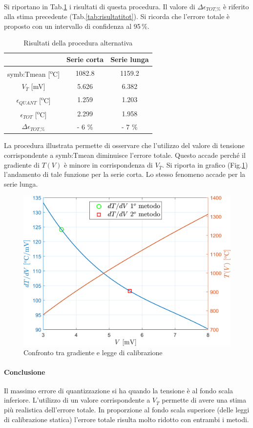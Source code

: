 Si riportano in Tab.\ref{tab:alternativa} i risultati di questa procedura. Il valore di $\Delta \epsilon_{\textit{TOT,\%}}$ è riferito alla stima precedente (Tab.\ref{tab:risultatitot}). Si ricorda che l'errore totale è proposto con un intervallo di confidenza al 95\,\%.

\begin{table}[H]
	\centering
	\begin{tabular}{c|c|c}
		\toprule
		\toprule
		& \textbf{Serie corta} & \textbf{Serie lunga}\\
		\midrule
		\gls{symb:Tmean} [\textsuperscript{o}C]& 1082.8 & 1159.2\\
		\midrule
		$V_{\overline{T}} $ [mV]& 5.626 & 6.382 \\
		\midrule
		$\epsilon_{\textit{QUANT}}$ [\textsuperscript{o}C]& 1.259 & 1.203 \\
		\midrule
		$\epsilon_{\textit{TOT}}$ [\textsuperscript{o}C]& 2.299 & 1.958\\
		\midrule
		$\Delta \epsilon_{\textit{TOT,\%}}$  & - 6 \% & - 7 \% \\
		\bottomrule
		\bottomrule
	\end{tabular}
	\caption{Risultati della procedura alternativa}
	\label{tab:alternativa}
\end{table}
La procedura illustrata permette di osservare che l'utilizzo del valore di tensione corrispondente a \gls{symb:Tmean} diminuisce l'errore totale. Questo accade perché il gradiente di $T(V)$ è minore in corrispondenza di $V_{\overline{T}}$. Si riporta in grafico (Fig.\ref{fig:confronto}) l'andamento di tale funzione per la serie corta. Lo stesso fenomeno accade per la serie lunga. 
\begin{figure}
	\centering
	\includegraphics[width=0.6\linewidth]{"../sperimentazione nei propulsori/confronto"}
	\caption{Confronto tra gradiente e legge di calibrazione}
	\label{fig:confronto}
\end{figure}
\paragraph{Conclusione}
Il massimo errore di quantizzazione si ha quando la tensione è al fondo scala inferiore. L'utilizzo di un valore corrispondente a $V_{\overline{T}}$ permette di avere una stima più realistica dell'errore totale. In proporzione al fondo scala superiore (delle leggi di calibrazione statica) l'errore totale risulta molto ridotto con entrambi i metodi. 